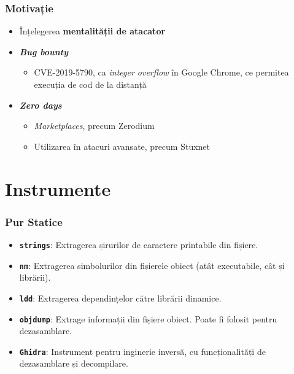 \documentclass[xcolor={table}]{beamer}
\begin{document}
	\begin{frame}
		\frametitle{Motivație}\pause
		\begin{itemize}[<+->]
		    \item Înțelegerea \textbf{mentalității de atacator}
		    \item \textbf{\textit{Bug bounty}}
    		    \begin{itemize}
    		        \item CVE-2019-5790, ca \textit{integer overflow} în Google Chrome, ce permitea execuția de cod de la distanță
    		    \end{itemize}
		    \item \textbf{\textit{Zero days}}
		        \begin{itemize}
    		        \item \textit{Marketplaces}, precum Zerodium
    		        \item Utilizarea în atacuri avansate, precum Stuxnet
    		    \end{itemize}
		\end{itemize}
	\end{frame}
	
	\section{Instrumente}
	
	\begin{frame}
		\frametitle{Pur Statice}\pause
		\begin{itemize}[<+->]
		    \item \textbf{\texttt{strings}}: Extragerea șirurilor de caractere printabile din fișiere.
		    \item \textbf{\texttt{nm}}: Extragerea simbolurilor din fișierele obiect (atât executabile, cât și librării).
		    \item \textbf{\texttt{ldd}}: Extragerea dependințelor către librării dinamice.
		    \item \textbf{\texttt{objdump}}: Extrage informații din fișiere obiect. Poate fi folosit pentru dezasamblare.
		    \item \textbf{\texttt{Ghidra}}: Instrument pentru inginerie inversă, cu funcționalități de dezasamblare și decompilare.
	    \end{itemize}
	\end{frame}
	
\end{document}
